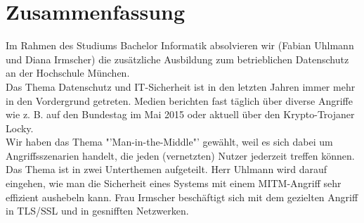 \section*{Zusammenfassung}
Im Rahmen des Studiums Bachelor Informatik absolvieren wir (Fabian Uhlmann und Diana Irmscher) die zusätzliche Ausbildung zum betrieblichen Datenschutz an der Hochschule München.
\\
Das Thema Datenschutz und IT-Sicherheit ist in den letzten Jahren immer mehr in den Vordergrund getreten. Medien berichten fast täglich über diverse Angriffe wie z. B. auf den Bundestag im Mai 2015 oder aktuell über den Krypto-Trojaner Locky.
\\	
Wir haben das Thema "'Man-in-the-Middle"' gewählt, weil es sich dabei um Angriffsszenarien handelt, die jeden (vernetzten) Nutzer jederzeit treffen können.
\\	
Das Thema ist in zwei Unterthemen aufgeteilt.
Herr Uhlmann wird darauf eingehen, wie man die Sicherheit eines Systems mit einem MITM-Angriff sehr effizient aushebeln kann.
Frau Irmscher beschäftigt sich mit dem gezielten Angriff in TLS/SSL und in gesnifften Netzwerken.
{}
		 
